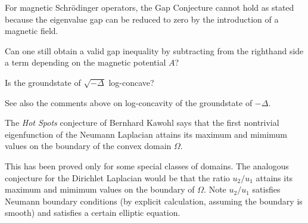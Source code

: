 \documentclass[12pt,letterpaper, reqno]{amsart}
\begin{document}
\begin{problemblock}
For magnetic Schr\"{o}\-dinger operators,
the Gap Conjecture cannot hold as stated because the eigenvalue gap
can be reduced to zero by the introduction of a magnetic field.


\begin{problem}
Can one still obtain a valid gap inequality by subtracting from the
righthand side a term depending on the magnetic potential $A$?
\end{problem}

\end{problemblock}

\begin{problemblock}

\begin{problem}
   Is the groundstate of $\sqrt{-\Delta}$ log-concave?
\end{problem}

See
also the comments above on log-concavity of the groundstate of
$-\Delta$.
\end{problemblock}

\begin{problemblock}

\begin{conjecture}
  The \emph{Hot Spots} conjecture of Bernhard Kawohl says that
the first nontrivial eigenfunction of the Neumann Laplacian attains
its maximum and mimimum values on the boundary of the convex domain
$\Omega$.
\end{conjecture}

 This has been proved only for some special classes of
domains. The analogous conjecture for the Dirichlet Laplacian would
be that the ratio $u_2/u_1$ attains its maximum and mimimum values
on the boundary of $\Omega$. Note $u_2/u_1$ satisfies Neumann
boundary conditions (by explicit calculation, assuming the boundary
is smooth) and satisfies a certain elliptic equation.

\end{problemblock}
\end{document}
